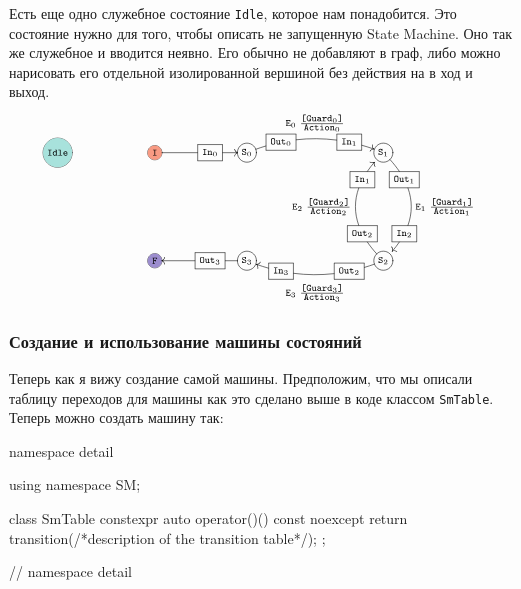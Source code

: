 \documentclass{article}
\begin{document}
{Есть еще одно служебное состояние \verb"Idle", которое нам понадобится.
Это состояние нужно для того, чтобы описать не запущенную State Machine.
Оно так же служебное и вводится неявно.
Его обычно не добавляют в граф, либо можно нарисовать его отдельной изолированной вершиной без действия на в ход и выход.
\[
\xymatrix@R=60pt{
  *+=+[o][F*:IdleColor][F-]{\scriptstyle\texttt{Idle}}&{}&
  *+=+[o][F*:InitialStateColor][F-]{\scriptstyle\texttt{I}}
  \ar[rr]|(0.6){\boxed{\scriptstyle\texttt{In}_0}}
  &{}&
  *+=+[o][F-]{\scriptstyle\texttt{S}_0}\ar@/^10pt/[rrr]^{\raisebox{6pt}{$\scriptstyle\texttt{E}_0\; \frac{\scriptstyle \texttt{[Guard}_0\texttt{]}}{\scriptstyle \texttt{Action}_0}$}}|(0.25){\boxed{\scriptstyle\texttt{Out}_0}}|(0.75){\boxed{\scriptstyle\texttt{In}_1}}
  &
  {}
  &
  {}
  &
  *+=+[o][F-]{\scriptstyle\texttt{S}_1}
    \ar@/^20pt/[d]^{\raisebox{0pt}{$\scriptstyle\texttt{E}_1\; \frac{\scriptstyle \texttt{[Guard}_1\texttt{]}}{\scriptstyle \texttt{Action}_1}$}}|(0.25){\boxed{\scriptstyle\texttt{Out}_1}}|(0.75){\boxed{\scriptstyle\texttt{In}_2}}
  \\
  {}&{}&
  *+=+[o][F*:FinalStateColor][F-]{\scriptstyle\texttt{F}}
  &{}&
  *+=+[o][F-]{\scriptstyle\texttt{S}_3}
  \ar[ll]|(0.4){\boxed{\scriptstyle\texttt{Out}_3}}
  &
  {}
  &
  {}
  &
  *+=+[o][F-]{\scriptstyle\texttt{S}_2}
  \ar@/^10pt/[lll]^{\raisebox{-12pt}{$\scriptstyle\texttt{E}_3\; \frac{\scriptstyle \texttt{[Guard}_3\texttt{]}}{\scriptstyle \texttt{Action}_3}$}}|(0.25){\boxed{\scriptstyle\texttt{Out}_2}}|(0.75){\boxed{\scriptstyle\texttt{In}_3}}
      \ar@/^20pt/[u]^{\raisebox{0pt}{$\scriptstyle\texttt{E}_2\; \frac{\scriptstyle \texttt{[Guard}_2\texttt{]}}{\scriptstyle \texttt{Action}_2}$}}|(0.25){\boxed{\scriptstyle\texttt{Out}_2}}|(0.75){\boxed{\scriptstyle\texttt{In}_1}}
  \\
}
\]

\subsubsection{Создание и использование машины состояний}

Теперь как я вижу создание самой машины.
Предположим, что мы описали таблицу переходов для машины как это сделано выше в коде классом \verb"SmTable".
Теперь можно создать машину так:
\begin{cppcode}
namespace detail {
using namespace SM;

class SmTable {
  constexpr auto operator()() const noexcept {
    return transition(/*description of the transition table*/);
  }
};
} // namespace detail


\end{cppcode}}
\end{document}

